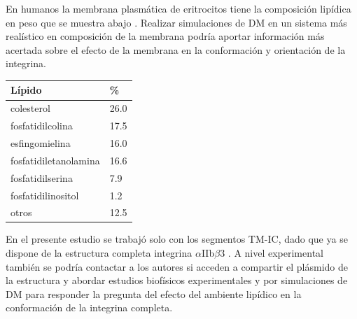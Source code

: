En humanos la membrana plasmática de eritrocitos tiene la composición lipídica en peso que se muestra  abajo \citep{Hildebrand1975, Bruce2002}. Realizar simulaciones de DM en un sistema más realístico en composición de la membrana podría aportar información más acertada sobre el efecto de la membrana en la conformación y orientación de la integrina.

\begin{table}[H]
\centering
\begin{tabular}{ll}
\rowcolor[HTML]{EFEFEF}
\hline
Lípido                & \%   \\ \hline
colesterol            & 26.0 \\
fosfatidilcolina      & 17.5 \\
esfingomielina        & 16.0 \\
fosfatidiletanolamina & 16.6 \\
fosfatidilserina      & 7.9  \\
fosfatidilinositol    & 1.2  \\
otros                 & 12.5 \\ \hline
\end{tabular}
\end{table}

En el presente estudio se trabajó solo con los segmentos TM-IC, dado que ya se dispone de la estructura completa integrina $\alpha$IIb$\beta$3 \citep{Adair2023}. A nivel experimental también se podría contactar a los autores si acceden a compartir el plásmido de la estructura y abordar estudios biofísicos experimentales y por simulaciones de DM para responder la pregunta del efecto del ambiente lipídico en la conformación de la integrina completa.